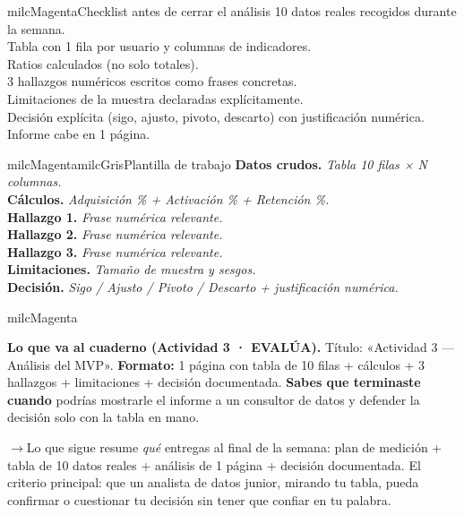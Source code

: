 \documentclass[11pt,letterpaper]{article}
\newcommand{\puente}[1]{%
  \begin{puentebox}%
    \textcolor{milcGradeDark}{$\rightarrow$}\hspace{2mm}#1%
  \end{puentebox}%
}
\newcommand{\checkbox}{\textcolor{milcGradeDark}{\fbox{\phantom{x}}}\hspace{5pt}}
\begin{document}
\begin{drawbox}{milcMagenta}{Checklist antes de cerrar el análisis}
\checkbox 10 datos reales recogidos durante la semana. \\[1mm] \checkbox Tabla con 1 fila por usuario y columnas de indicadores. \\[1mm] \checkbox Ratios calculados (no solo totales). \\[1mm] \checkbox 3 hallazgos numéricos escritos como frases concretas. \\[1mm] \checkbox Limitaciones de la muestra declaradas explícitamente. \\[1mm] \checkbox Decisión explícita (sigo, ajusto, pivoto, descarto) con justificación numérica. \\[1mm] \checkbox Informe cabe en 1 página.
\end{drawbox}

\begin{softbox}{milcMagenta}{milcGris}{Plantilla de trabajo}
\textbf{Datos crudos.} \textit{Tabla 10 filas × N columnas.} \\[1mm] \textbf{Cálculos.} \textit{Adquisición \% + Activación \% + Retención \%.} \\[1mm] \textbf{Hallazgo 1.} \textit{Frase numérica relevante.} \\[1mm] \textbf{Hallazgo 2.} \textit{Frase numérica relevante.} \\[1mm] \textbf{Hallazgo 3.} \textit{Frase numérica relevante.} \\[1mm] \textbf{Limitaciones.} \textit{Tamaño de muestra y sesgos.} \\[1mm] \textbf{Decisión.} \textit{Sigo / Ajusto / Pivoto / Descarto + justificación numérica.}
\end{softbox}

\begin{infoband}{milcMagenta}


\textbf{Lo que va al cuaderno (Actividad 3 · EVALÚA).} Título: «Actividad 3 --- Análisis del MVP». \textbf{Formato:} 1 página con tabla de 10 filas + cálculos + 3 hallazgos + limitaciones + decisión documentada. \textbf{Sabes que terminaste cuando} podrías mostrarle el informe a un consultor de datos y defender la decisión solo con la tabla en mano.
\end{infoband}

\puente{Lo que sigue resume \emph{qué} entregas al final de la semana: plan de medición + tabla de 10 datos reales + análisis de 1 página + decisión documentada. El criterio principal: que un analista de datos junior, mirando tu tabla, pueda confirmar o cuestionar tu decisión sin tener que confiar en tu palabra.}
\end{document}
